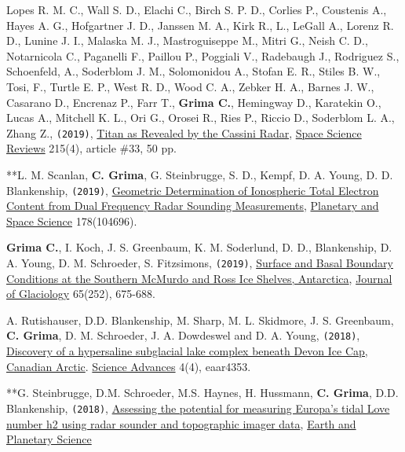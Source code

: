 \begin{etaremune}
\item
  Lopes R. M. C., Wall S. D., Elachi C., Birch S. P. D., Corlies P., Coustenis A., Hayes A. G., Hofgartner J. D., Janssen M. A., Kirk R., L., LeGall A., Lorenz R. D., Lunine J. I., Malaska M. J., Mastroguiseppe M., Mitri G., Neish C. D., Notarnicola C., Paganelli F., Paillou P., Poggiali V., Radebaugh J., Rodriguez S., Schoenfeld, A., Soderblom J. M., Solomonidou A., Stofan E. R., Stiles B. W., Tosi, F., Turtle E. P., West R. D., Wood C. A., Zebker H. A., Barnes J. W., Casarano D., Encrenaz P., Farr T., \textbf{Grima C.}, Hemingway D., Karatekin O., Lucas A., Mitchell K. L., Ori G., Orosei R., Ries P., Riccio D., Soderblom L. A., Zhang Z., \texttt{(2019)}, \href{https://ui.adsabs.harvard.edu/abs/2019SSRv..215...33L/abstract}{Titan as Revealed by the Cassini Radar}, \ul{Space Science Reviews} 215(4), article \#33, 50 pp.
\item
  **L. M. Scanlan, \textbf{C. Grima}, G. Steinbrugge, S. D., Kempf, D. A. Young, D. D. Blankenship, \texttt{(2019)}, \href{https://www.sciencedirect.com/science/article/pii/S0032063319300820}{Geometric Determination of Ionospheric Total Electron Content from Dual Frequency Radar Sounding Measurements}, \ul{Planetary and Space Science} 178(104696).
\item
  \textbf{Grima C.}, I. Koch, J. S. Greenbaum, K. M. Soderlund, D. D., Blankenship, D. A. Young, D. M. Schroeder, S. Fitzsimons, \texttt{(2019)}, \href{https://www.cambridge.org/core/journals/journal-of-glaciology/article/surface-and-basal-boundary-conditions-at-the-southern-mcmurdo-and-ross-ice-shelves-antarctica/3ED3BFD465A3F6A5FC48342694F91EC5}{Surface and Basal Boundary Conditions at the Southern McMurdo and Ross Ice Shelves, Antarctica}, \ul{Journal of Glaciology} 65(252), 675-688.
\item
  A. Rutishauser, D.D. Blankenship, M. Sharp, M. L.
  Skidmore, J. S. Greenbaum, \textbf{C. Grima}, D. M. Schroeder, J. A.
  Dowdeswel and D. A. Young, \texttt{(2018)},
  \href{http://advances.sciencemag.org/content/4/4/eaar4353}{Discovery
  of a hypersaline subglacial lake complex beneath Devon Ice Cap,
  Canadian Arctic}. \ul{Science Advances} 4(4), eaar4353.
\item
  **G. Steinbrugge, D.M. Schroeder, M.S. Haynes, H. Hussmann,
  \textbf{C. Grima}, D.D. Blankenship, \texttt{(2018)},
  \href{https://www.sciencedirect.com/science/article/pii/S0012821X17306647}{Assessing
  the potential for measuring Europa's tidal Love number h2 using radar
  sounder and topographic imager data}, \ul{Earth and Planetary Science
}
\end{etaremune}
